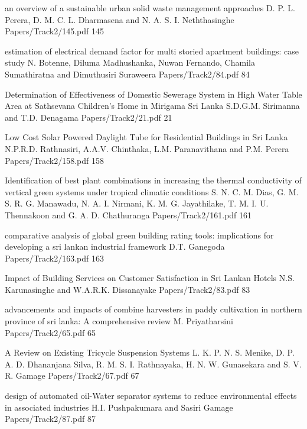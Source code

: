    
\addpaper
{an overview of a sustainable urban solid waste management approaches}
{D. P. L. Perera, D. M. C. L. Dharmasena and N. A. S. I. Neththasinghe}
{Papers/Track2/145.pdf}
{145}


\addpaper
{estimation of electrical demand factor for multi
storied apartment buildings: case study}
{N. Botenne, Diluma Madhushanka, Nuwan Fernando,
Chamila Sumathiratna and Dimuthusiri Suraweera}
{Papers/Track2/84.pdf}
{84}

\addpaper
{Determination of Effectiveness of Domestic Sewerage System in High Water Table Area at Sathsevana Children's Home in Mirigama Sri Lanka}
{S.D.G.M. Sirimanna and T.D. Denagama}
{Papers/Track2/21.pdf}
{21}


    \addpaper
{Low Cost Solar Powered Daylight Tube for Residential Buildings in Sri Lanka}
 {N.P.R.D. Rathnasiri, A.A.V. Chinthaka, L.M. Paranavithana and P.M. Perera} 
 {Papers/Track2/158.pdf}
   {158} 


    \addpaper
{Identification of best plant combinations in increasing the thermal conductivity of vertical green systems under tropical climatic conditions}
 {S. N. C. M. Dias, G. M. S. R. G. Manawadu, N. A. I. Nirmani, K. M. G.
Jayathilake, T. M. I. U. Thennakoon and G. A. D. Chathuranga} 
 {Papers/Track2/161.pdf}
   {161} 


   \addpaper
{comparative analysis of global green building rating tools: implications for developing a sri lankan industrial framework}
 {D.T. Ganegoda} 
 {Papers/Track2/163.pdf}
   {163} 



\addpaper
{Impact of Building Services on Customer Satisfaction in Sri Lankan Hotels}
{N.S. Karunasinghe and W.A.R.K. Dissanayake}
{Papers/Track2/83.pdf}
{83}



     \addpaper
 	{advancements and impacts of combine harvesters in paddy cultivation in northern province of sri lanka: A comprehensive review}
		 {M. Priyatharsini} 
		 {Papers/Track2/65.pdf}
     {65} 


     

   


     \addpaper
 	{A Review on Existing Tricycle Suspension Systems}
		 {L. K. P. N. S. Menike, D. P. A. D. Dhananjana Silva, R. M. S. I. Rathnayaka, H. N. W. Gunasekara and S. V. R. Gamage} 
		 {Papers/Track2/67.pdf}
     {67} 


\addpaper
{design of automated oil-Water separator systems to reduce environmental effects in associated industries}
{H.I. Pushpakumara and Sasiri Gamage}
{Papers/Track2/87.pdf}
{87}



